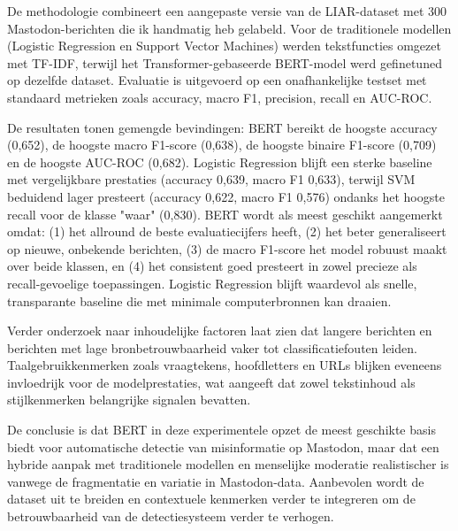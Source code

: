 De methodologie combineert een aangepaste versie van de LIAR-dataset met 300 Mastodon-berichten die ik handmatig heb gelabeld. Voor de traditionele modellen (Logistic Regression en Support Vector Machines) werden tekstfuncties omgezet met TF-IDF, terwijl het Transformer-gebaseerde BERT-model werd gefinetuned op dezelfde dataset. Evaluatie is uitgevoerd op een onafhankelijke testset met standaard metrieken zoals accuracy, macro F1, precision, recall en AUC-ROC.

De resultaten tonen gemengde bevindingen: BERT bereikt de hoogste accuracy (0,652), de hoogste macro F1-score (0,638), de hoogste binaire F1-score (0,709) en de hoogste AUC-ROC (0,682). Logistic Regression blijft een sterke baseline met vergelijkbare prestaties (accuracy 0,639, macro F1 0,633), terwijl SVM beduidend lager presteert (accuracy 0,622, macro F1 0,576) ondanks het hoogste recall voor de klasse "waar" (0,830). BERT wordt als meest geschikt aangemerkt omdat: (1) het allround de beste evaluatiecijfers heeft, (2) het beter generaliseert op nieuwe, onbekende berichten, (3) de macro F1-score het model robuust maakt over beide klassen, en (4) het consistent goed presteert in zowel precieze als recall-gevoelige toepassingen. Logistic Regression blijft waardevol als snelle, transparante baseline die met minimale computerbronnen kan draaien.

Verder onderzoek naar inhoudelijke factoren laat zien dat langere berichten en berichten met lage bronbetrouwbaarheid vaker tot classificatiefouten leiden. Taalgebruikkenmerken zoals vraagtekens, hoofdletters en URLs blijken eveneens invloedrijk voor de modelprestaties, wat aangeeft dat zowel tekstinhoud als stijlkenmerken belangrijke signalen bevatten.

De conclusie is dat BERT in deze experimentele opzet de meest geschikte basis biedt voor automatische detectie van misinformatie op Mastodon, maar dat een hybride aanpak met traditionele modellen en menselijke moderatie realistischer is vanwege de fragmentatie en variatie in Mastodon-data. Aanbevolen wordt de dataset uit te breiden en contextuele kenmerken verder te integreren om de betrouwbaarheid van de detectiesysteem verder te verhogen.
